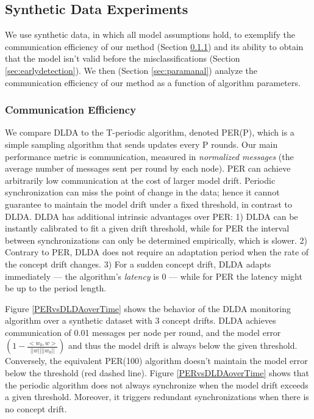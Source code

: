 \documentclass{vldb}
\begin{document}
\subsection{Synthetic Data Experiments}
We use synthetic data, in which all model assumptions hold, to
exemplify the communication efficiency of our method (Section \ref{sec:com_eff})
and its ability to obtain that the model isn't valid before the
misclassifications (Section \ref{sec:earlydetection}). We then (Section \ref{sec:paramanal}) analyze the communication efficiency of our method as a function of algorithm parameters.

\subsubsection{Communication Efficiency}\label{sec:com_eff}
We compare DLDA to the T-periodic algorithm, denoted
PER(P), which is a simple sampling algorithm that sends updates
every P rounds.
Our main performance metric is communication, measured in \textit{normalized messages} (the average number of messages sent per round by each node). PER can achieve arbitrarily low communication at the cost of larger model drift. Periodic synchronization can miss the point of change in the data; hence it cannot guarantee to maintain the model drift under a fixed threshold, in contrast to DLDA.  DLDA has additional intrinsic advantages over PER: 1) DLDA can be instantly calibrated to fit a given drift threshold, while for PER the interval between synchronizations can only be determined empirically, which is slower. 2) Contrary to PER, DLDA does not require an adaptation period when the rate of the concept drift changes. 3) For a sudden concept drift, DLDA adapts immediately --- the algorithm's \textit{latency} is 0 --- while for PER the latency might be up to the period length.
	
Figure \ref{PERvsDLDAoverTime} shows the behavior of the DLDA monitoring
algorithm over a synthetic dataset with 3 concept drifts.
DLDA achieves communication of 0.01 messages per node per round, and
the model error $(1 - \frac{<w_0,w>}{||w||||w_0||})$ and thus the model drift  is always below the given threshold.
Conversely, the equivalent PER(100) algorithm doesn't maintain the
model error below the threshold (red dashed line).
Figure \ref{PERvsDLDAoverTime} shows that the periodic algorithm does not always  synchronize when the model drift exceeds a given threshold. Moreover, it  triggers redundant synchronizations when there is no concept drift.
\end{document}
